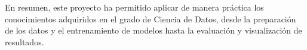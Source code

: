 \documentclass[11pt,spanish,listoffigures,listoftables]{tfgetsinf}
\begin{document}
En resumen, este proyecto ha permitido aplicar de manera práctica los conocimientos adquiridos en el grado de Ciencia de Datos, desde la preparación de los datos y el entrenamiento de modelos hasta la evaluación y visualización de resultados.








\cleardoublepage


\APPENDIX










\end{document}
